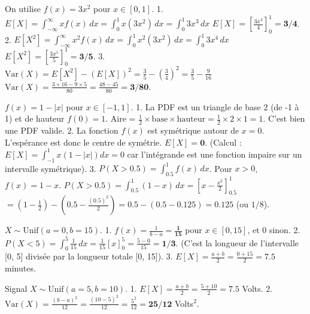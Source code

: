 \begin{correctionbox}
On utilise $f(x) = 3x^2$ pour $x \in [0, 1]$.
1.  $E[X] = \int_{-\infty}^{\infty} x f(x) \, dx = \int_0^1 x (3x^2) \, dx = \int_0^1 3x^3 \, dx$
    $E[X] = \left[ \frac{3x^4}{4} \right]_0^1 = \mathbf{3/4}$.
2.  $E[X^2] = \int_{-\infty}^{\infty} x^2 f(x) \, dx = \int_0^1 x^2 (3x^2) \, dx = \int_0^1 3x^4 \, dx$
    $E[X^2] = \left[ \frac{3x^5}{5} \right]_0^1 = \mathbf{3/5}$.
3.  $\text{Var}(X) = E[X^2] - (E[X])^2 = \frac{3}{5} - \left(\frac{3}{4}\right)^2 = \frac{3}{5} - \frac{9}{16}$
    $\text{Var}(X) = \frac{3 \times 16 - 9 \times 5}{80} = \frac{48 - 45}{80} = \mathbf{3/80}$.
\end{correctionbox}

\begin{correctionbox}
$f(x) = 1 - |x|$ pour $x \in [-1, 1]$.
1.  La PDF est un triangle de base 2 (de -1 à 1) et de hauteur $f(0)=1$.
    Aire = $\frac{1}{2} \times \text{base} \times \text{hauteur} = \frac{1}{2} \times 2 \times 1 = 1$. C'est bien une PDF valide.
2.  La fonction $f(x)$ est symétrique autour de $x=0$. L'espérance est donc le centre de symétrie.
    $E[X] = \mathbf{0}$.
    (Calcul : $E[X] = \int_{-1}^1 x(1-|x|)dx = 0$ car l'intégrande est une fonction impaire sur un intervalle symétrique).
3.  $P(X > 0.5) = \int_{0.5}^1 f(x) \, dx$. Pour $x>0$, $f(x) = 1-x$.
    $P(X > 0.5) = \int_{0.5}^1 (1-x) \, dx = \left[ x - \frac{x^2}{2} \right]_{0.5}^1$
    $= \left(1 - \frac{1}{2}\right) - \left(0.5 - \frac{(0.5)^2}{2}\right) = 0.5 - (0.5 - 0.125) = \mathbf{0.125}$ (ou $1/8$).
\end{correctionbox}


\begin{correctionbox}
$X \sim \text{Unif}(a=0, b=15)$.
1.  $f(x) = \frac{1}{b-a} = \mathbf{\frac{1}{15}}$ pour $x \in [0, 15]$, et 0 sinon.
2.  $P(X < 5) = \int_0^5 \frac{1}{15} \, dx = \frac{1}{15} [x]_0^5 = \frac{5-0}{15} = \mathbf{1/3}$.
    (C'est la longueur de l'intervalle [0, 5] divisée par la longueur totale [0, 15]).
3.  $E[X] = \frac{a+b}{2} = \frac{0+15}{2} = \mathbf{7.5}$ minutes.
\end{correctionbox}

\begin{correctionbox}
Signal $X \sim \text{Unif}(a=5, b=10)$.
1.  $E[X] = \frac{a+b}{2} = \frac{5+10}{2} = \mathbf{7.5}$ Volts.
2.  $\text{Var}(X) = \frac{(b-a)^2}{12} = \frac{(10-5)^2}{12} = \frac{5^2}{12} = \mathbf{25/12}$ Volts$^2$.
\end{correctionbox}

